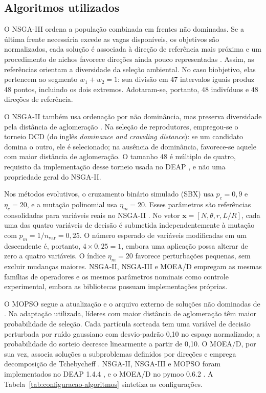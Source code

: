 \documentclass[a4paper,11pt]{article}
\begin{document}
\subsection{Algoritmos utilizados}
\label{subsec:algoritmos}

O NSGA-III ordena a população combinada em frentes não dominadas. Se a última
frente necessária excede as vagas disponíveis, os objetivos são normalizados,
cada solução é associada à direção de referência mais próxima e um procedimento
de nichos favorece direções ainda pouco representadas \citep{deb2014nsga3}.
Assim, as referências orientam a diversidade da seleção ambiental. No caso
biobjetivo, elas pertencem ao segmento $w_1+w_2=1$: sua divisão em 47
intervalos iguais produz 48 pontos, incluindo os dois extremos. Adotaram-se,
portanto, 48 indivíduos e 48 direções de referência.

O NSGA-II também usa ordenação por não dominância, mas preserva diversidade
pela distância de aglomeração \citep{deb2002}. Na seleção de reprodutores,
empregou-se o torneio DCD (do inglês \textit{dominance and crowding distance}):
se um candidato domina o outro, ele é selecionado; na ausência de dominância,
favorece-se aquele com maior distância de aglomeração. O tamanho 48 é múltiplo
de quatro, requisito da implementação desse torneio usada no DEAP
\citep{fortin2012deap}, e não uma propriedade geral do NSGA-II.

Nos métodos evolutivos, o cruzamento binário simulado (SBX) usa $p_c=0{,}9$ e
$\eta_c=20$, e a mutação polinomial usa $\eta_m=20$. Esses parâmetros são
referências consolidadas para variáveis reais no NSGA-II \citep{deb2002}.
No vetor $\mathbf{x}=[N,\theta,r,L/R]$, cada uma das quatro variáveis de
decisão é submetida independentemente à mutação com
$p_m=1/n_{\mathrm{var}}=0{,}25$. O número esperado de variáveis modificadas em
um descendente é, portanto, $4\times0{,}25=1$, embora uma aplicação possa
alterar de zero a quatro variáveis. O índice $\eta_m=20$ favorece perturbações
pequenas, sem excluir mudanças maiores. NSGA-II, NSGA-III e MOEA/D empregam as
mesmas famílias de operadores e os mesmos parâmetros nominais como controle
experimental, embora as bibliotecas possuam implementações próprias.

O MOPSO segue a atualização e o arquivo externo de soluções não dominadas de
\citet{coello2002mopso,coello2004mopso}. Na adaptação utilizada, líderes com
maior distância de aglomeração têm maior probabilidade de seleção. Cada
partícula sorteada tem uma variável de decisão perturbada por ruído gaussiano
com desvio-padrão 0,10 no espaço normalizado; a probabilidade do sorteio decresce
linearmente a partir de 0,10. O MOEA/D, por sua vez, associa soluções a
subproblemas definidos por direções e emprega decomposição de Tchebycheff
\citep{zhang2007moead}. NSGA-II, NSGA-III e MOPSO foram implementados no DEAP
1.4.4 \citep{fortin2012deap}, e o MOEA/D no pymoo 0.6.2
\citep{blank2020}. A Tabela~\ref{tab:configuracao-algoritmos} sintetiza as
configurações.
\end{document}
